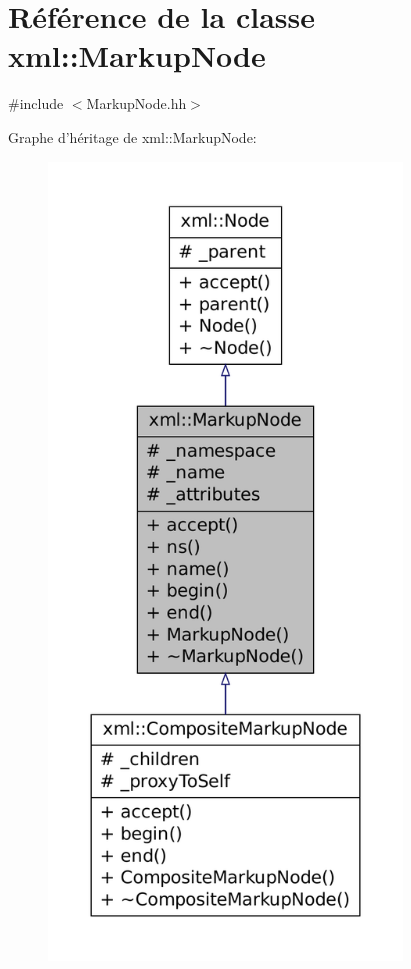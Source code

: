 \hypertarget{classxml_1_1_markup_node}{
\section{Référence de la classe xml::MarkupNode}
\label{classxml_1_1_markup_node}
}


{\ttfamily \#include $<$MarkupNode.hh$>$}



Graphe d'héritage de xml::MarkupNode:
\nopagebreak
\begin{figure}[H]
\begin{center}
\leavevmode
\includegraphics[height=600pt]{classxml_1_1_markup_node__inherit__graph}
\end{center}
\end{figure}



